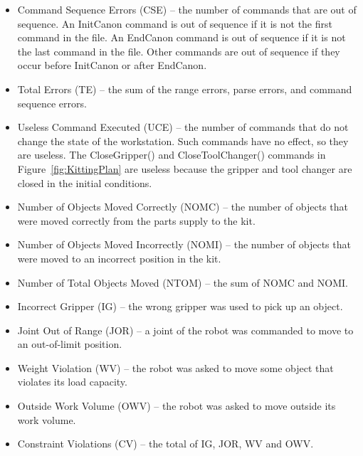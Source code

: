\begin{itemize}
\item \sf Command Sequence Errors (CSE) \rm -- the number of commands that are
  out of sequence. An InitCanon command is out of sequence if it is not the
  first command in the file. An EndCanon command is out of sequence if it
  is not the last command in the file. Other commands are out of sequence
  if they occur before InitCanon or after EndCanon.\\

\item \sf Total Errors (TE) \rm -- the sum of the range errors, parse errors,
  and command sequence errors.\\

\item \sf Useless Command Executed (UCE) \rm -- the number of commands that do
  not change the state of the workstation. Such commands have no effect, so
  they are useless. The \sf CloseGripper() \rm and \sf CloseToolChanger()
  \rm commands in Figure~\ref{fig:KittingPlan} are useless because the
  gripper and tool changer are closed in the initial conditions.\\
  
\item \sf Number of Objects Moved Correctly (NOMC) \rm -- the number of objects
  that were moved correctly from the parts supply to the kit.\\

\item \sf Number of Objects Moved Incorrectly (NOMI) \rm -- the number of objects
  that were moved to an incorrect position in the kit.\\
  
\item \sf Number of Total Objects Moved (NTOM) \rm -- the sum of NOMC and NOMI.\\

\item \sf Incorrect Gripper (IG) \rm -- the wrong gripper was used to pick up an object.\\

\item \sf Joint Out of Range (JOR) \rm -- a joint of the robot was commanded to 
  move to an out-of-limit position.\\

\item \sf Weight Violation (WV) \rm -- the robot was asked to move some object that
  violates its load capacity.\\
  
\item \sf Outside Work Volume (OWV) \rm -- the robot was asked to move outside its
  work volume.\\
  
\item \sf Constraint Violations (CV) \rm -- the total of IG, JOR, WV and OWV.

\end{itemize}

